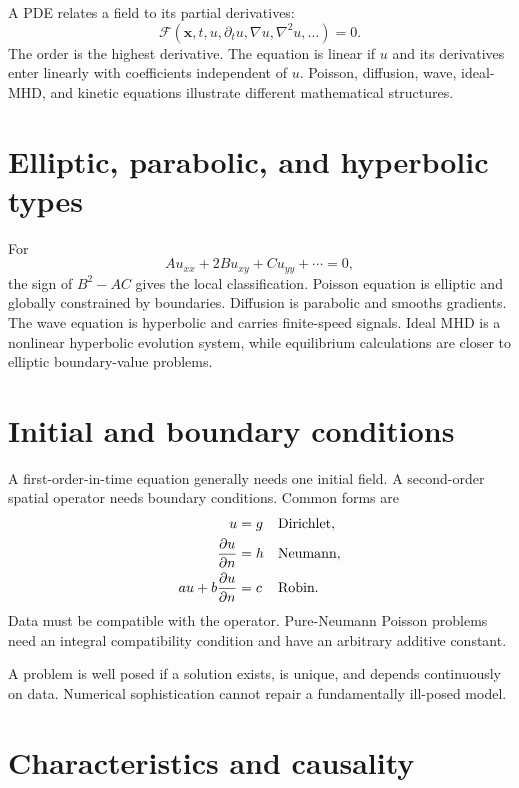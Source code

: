 \documentclass[11pt]{article}
\begin{document}
A PDE relates a field to its partial derivatives:
\begin{equation}
\mathcal F(\mathbf x,t,u,\partial_tu,\nabla u,\nabla^2u,\ldots)=0.
\end{equation}
The order is the highest derivative. The equation is linear if $u$ and its derivatives enter linearly with coefficients independent of $u$. Poisson, diffusion, wave, ideal-MHD, and kinetic equations illustrate different mathematical structures.


\section{Elliptic, parabolic, and hyperbolic types}

For
\begin{equation}
Au_{xx}+2Bu_{xy}+Cu_{yy}+\cdots=0,
\end{equation}
the sign of $B^2-AC$ gives the local classification. Poisson equation is elliptic and globally constrained by boundaries. Diffusion is parabolic and smooths gradients. The wave equation is hyperbolic and carries finite-speed signals. Ideal MHD is a nonlinear hyperbolic evolution system, while equilibrium calculations are closer to elliptic boundary-value problems.


\section{Initial and boundary conditions}

A first-order-in-time equation generally needs one initial field. A second-order spatial operator needs boundary conditions. Common forms are
\begin{align}
u&=g &&\text{Dirichlet},\\
\pdv{u}{n}&=h &&\text{Neumann},\\
au+b\pdv{u}{n}&=c &&\text{Robin}.
\end{align}
Data must be compatible with the operator. Pure-Neumann Poisson problems need an integral compatibility condition and have an arbitrary additive constant.

A problem is well posed if a solution exists, is unique, and depends continuously on data. Numerical sophistication cannot repair a fundamentally ill-posed model.


\section{Characteristics and causality}
\end{document}
